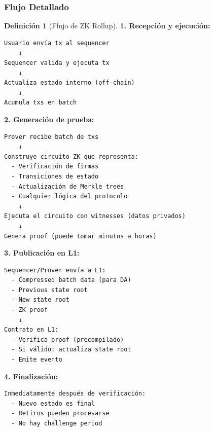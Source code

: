\documentclass[11pt,a4paper,twoside,openright]{book}
\theoremstyle{definition}
\newtheorem{definition}{Definición}[chapter]
\theoremstyle{plain}
\theoremstyle{remark}
\begin{document}
\subsubsection{Flujo Detallado}

\begin{definition}[Flujo de ZK Rollup]
\textbf{1. Recepción y ejecución:}
\begin{verbatim}
Usuario envía tx al sequencer
    ↓
Sequencer valida y ejecuta tx
    ↓
Actualiza estado interno (off-chain)
    ↓
Acumula txs en batch
\end{verbatim}

\textbf{2. Generación de prueba:}
\begin{verbatim}
Prover recibe batch de txs
    ↓
Construye circuito ZK que representa:
  - Verificación de firmas
  - Transiciones de estado
  - Actualización de Merkle trees
  - Cualquier lógica del protocolo
    ↓
Ejecuta el circuito con witnesses (datos privados)
    ↓
Genera proof (puede tomar minutos a horas)
\end{verbatim}

\textbf{3. Publicación en L1:}
\begin{verbatim}
Sequencer/Prover envía a L1:
  - Compressed batch data (para DA)
  - Previous state root
  - New state root
  - ZK proof
    ↓
Contrato en L1:
  - Verifica proof (precompilado)
  - Si válido: actualiza state root
  - Emite evento
\end{verbatim}

\textbf{4. Finalización:}
\begin{verbatim}
Inmediatamente después de verificación:
  - Nuevo estado es final
  - Retiros pueden procesarse
  - No hay challenge period
\end{verbatim}
\end{definition}

\begin{center}
\end{center}
\end{document}
